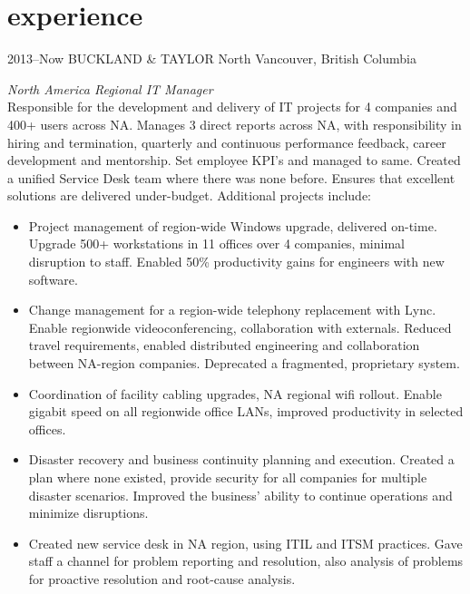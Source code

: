 \documentclass[]{friggeri-cv} %
\begin{document}

\section{experience}

\begin{entrylist}
\entry
{2013--Now}
{BUCKLAND \& TAYLOR}
{North Vancouver, British Columbia}
{\emph{North America Regional IT Manager} \\
Responsible for the development and delivery of IT projects for 4 companies and 400+ users across NA. Manages 3 direct reports across NA, with responsibility in hiring and termination, quarterly and continuous performance feedback, career development and mentorship. Set employee KPI's and managed to same. Created a unified Service Desk team where there was none before. Ensures that excellent solutions are delivered under-budget. Additional projects include: \\
\begin{itemize}
\item Project management of region-wide Windows upgrade, delivered on-time. Upgrade 500+ workstations in 11 offices over 4 companies, minimal disruption to staff. Enabled 50\% productivity gains for engineers with new software.
\item Change management for a region-wide telephony replacement with Lync. Enable regionwide videoconferencing, collaboration with externals. Reduced travel requirements, enabled distributed engineering and collaboration between NA-region companies. Deprecated a fragmented, proprietary system.
\item Coordination of facility cabling upgrades, NA regional wifi rollout. Enable gigabit speed on all regionwide office LANs, improved productivity in selected offices.
\item Disaster recovery and business continuity planning and execution. Created a plan where none existed, provide security for all companies for multiple disaster scenarios. Improved the business' ability to continue operations and minimize disruptions.
\item Created new service desk in NA region, using ITIL and ITSM practices. Gave staff a channel for problem reporting and resolution, also analysis of problems for proactive resolution and root-cause analysis.

\end{itemize}}
\end{entrylist}
\end{document}
